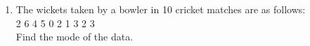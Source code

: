 \renewcommand{\theequation}{\theenumi}
\begin{enumerate}[label=\arabic*.,ref=\thesubsection.\theenumi]
\item The wickets taken by a bowler in 10 cricket matches are as follows:\\
2 6 4 5 0 2 1 3 2 3\\
Find the mode of the data.\\
\end{enumerate}